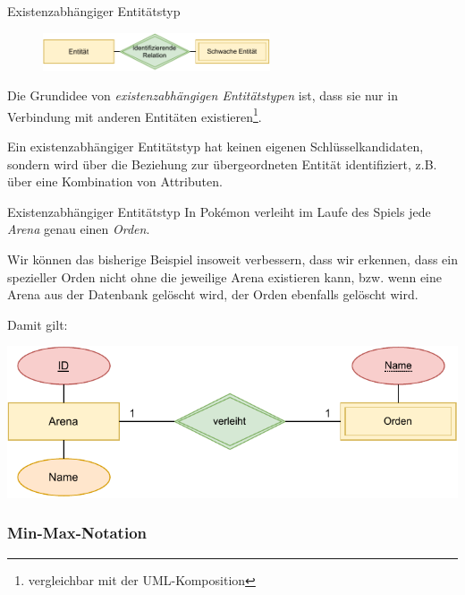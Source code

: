 \begin{defi}{Existenzabhängiger Entitätstyp}
    \begin{figure}
        \begin{center}
            \includegraphics[width=0.6\textwidth]{includes/figures/definition_entity_relationship_model_entity_weak.pdf}
        \end{center}
    \end{figure}
    Die Grundidee von \emph{existenzabhängigen Entitätstypen} ist, dass sie nur in Verbindung mit anderen Entitäten existieren\footnote{vergleichbar mit der UML-Komposition}.

    Ein existenzabhängiger Entitätstyp hat keinen eigenen Schlüsselkandidaten, sondern wird über die Beziehung zur übergeordneten Entität identifiziert, z.B. über eine Kombination von Attributen.
\end{defi}

\begin{example}{Existenzabhängiger Entitätstyp}
    In Pokémon verleiht im Laufe des Spiels jede \emph{Arena} genau einen \emph{Orden}.

    Wir können das bisherige Beispiel insoweit verbessern, dass wir erkennen, dass ein spezieller Orden nicht ohne die jeweilige Arena existieren kann, bzw. wenn eine Arena aus der Datenbank gelöscht wird, der Orden ebenfalls gelöscht wird.

    Damit gilt:
    \begin{center}
        \includegraphics[width=0.7\linewidth]{includes/figures/example_entity_relationship_modell_entity_weak.pdf}
    \end{center}
\end{example}

\subsubsection{Min-Max-Notation}

